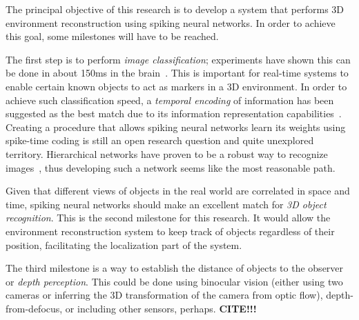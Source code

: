 The principal objective of this research is to develop a system that performs 3D environment reconstruction using spiking neural networks. In order to achieve this goal, some milestones will have to be reached. 

The first step is to perform \emph{image classification}; experiments have shown this can be done in about 150ms in the brain~\cite{Thorpe1996-speed-of-processing}. This is important for real-time systems to enable certain known objects to act as markers in a 3D environment. In order to achieve such classification speed, a \emph{temporal encoding} of information has been suggested as the best match due to its information representation capabilities~\cite{VanRullen2005-spike-times}. Creating a procedure that allows spiking neural networks learn its weights using spike-time coding is still an open research question and quite unexplored territory. Hierarchical networks have proven to be a robust way to recognize images~\cite{Behnke2003-hierachical-interpretation,Bengio2009-deep-architectures}, thus developing such a network seems like the most reasonable path. 

Given that different views of objects in the real world are correlated in space and time, spiking neural networks should make an excellent match for \emph{3D object recognition}. This is the second milestone for this research. It would allow the environment reconstruction system to keep track of objects regardless of their position, facilitating the localization part of the system.

The third milestone is a way to establish the distance of objects to the observer or \emph{depth perception}. This could be done using binocular vision (either using two cameras or inferring the 3D transformation of the camera from optic flow), depth-from-defocus, or including other sensors, perhaps. \textbf{CITE!!!}

